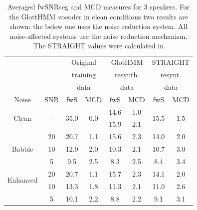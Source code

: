 \begin{table}[!htb]
\begin{centering}
\begin{tabular}{c c|c c|c c|c c}
	 & & \multicolumn{2}{c|}{Original} & \multicolumn{2}{c|}{GlotHMM} & \multicolumn{2}{c}{STRAIGHT}\\
	 & & \multicolumn{2}{c|}{training} & \multicolumn{2}{c|}{resynth.} & \multicolumn{2}{c}{resynt.}\\
	 & & \multicolumn{2}{c|}{data} & \multicolumn{2}{c|}{data} & \multicolumn{2}{c}{data}\\
	Noise & SNR & fwS & MCD & fwS & MCD & fwS & MCD\\
	\midrule
	\midrule
	\multirow{2}{*}{Clean} & \multirow{2}{*}{-} & \multirow{2}{*}{35.0} & \multirow{2}{*}{0.0} & 14.6 & 1.0 & \multirow{2}{*}{15.5} & \multirow{2}{*}{1.5}\\
	 & & & & 15.9 & 2.1 & & \\	
	\midrule
	\multirow{3}{*}{Babble} & 20 & 20.7 & 1.1 & 15.6 & 2.3 & 14.0 & 2.0\\
	 & 10 & 12.9 & 2.0 & 10.3 & 2.1 & 10.7 & 3.0\\
	 & 5 & 9.5 & 2.5 & 8.3 & 2.5 & 8.4 & 3.4\\
	\midrule
	\midrule
	\multirow{2}{*}{Enhanced} & 20 & 20.7 & 1.1 & 15.7 & 2.3 & 14.1 & 2.0\\
	\multirow{2}{*}{Babble} & 10 & 13.3 & 1.8 & 11.3 & 2.1 & 11.0 & 2.6\\
	 & 5 & 10.1 & 2.2 & 8.8 & 2.2 & 9.1 & 3.1\\
	\bottomrule
\end{tabular}
\caption{Averaged fwSNRseg and MCD measures for 3 speakers. For the GlottHMM vocoder in clean conditions two results are shown: the below one uses the noise reduction system. All noise-affected systems use the noise reduction mechanism. The STRAIGHT values were calculated in \cite{karhila_jstsp_14}}
\label{table:an_resyn_results}
\end{centering}
\end{table}

